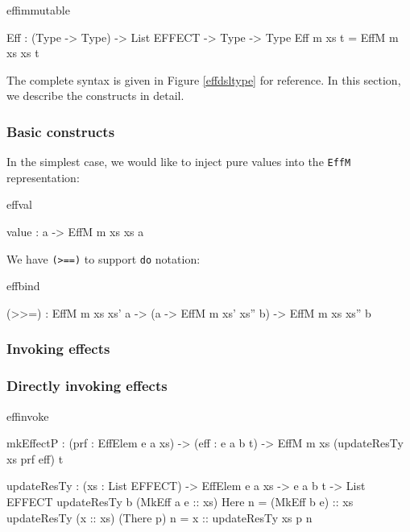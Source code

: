 \begin{SaveVerbatim}{effimmutable}

Eff : (Type -> Type) -> List EFFECT -> Type -> Type
Eff m xs t = EffM m xs xs t

\end{SaveVerbatim}

\noindent
The complete syntax is given in Figure \ref{effdsltype} for reference. In this
section, we describe the constructs in detail.

\subsubsection{Basic constructs}

In the simplest case, we would like to inject pure values into the
\texttt{EffM} representation:

\begin{SaveVerbatim}{effval}

value : a -> EffM m xs xs a

\end{SaveVerbatim}

We have \texttt{(>==)} to support \texttt{do} notation:

\begin{SaveVerbatim}{effbind}

(>>=) : EffM m xs xs' a -> 
        (a -> EffM m xs' xs'' b) -> EffM m xs xs'' b

\end{SaveVerbatim}

\subsubsection{Invoking effects}

\subsubsection*{Directly invoking effects}

\begin{SaveVerbatim}{effinvoke}

mkEffectP : (prf : EffElem e a xs) -> (eff : e a b t) -> 
          EffM m xs (updateResTy xs prf eff) t

\end{SaveVerbatim}

\begin{SaveVerbatim}{}

updateResTy : (xs : List EFFECT) -> 
              EffElem e a xs -> e a b t -> List EFFECT
updateResTy {b} (MkEff a e :: xs) Here      n 
                 = (MkEff b e) :: xs
updateResTy     (x :: xs)         (There p) n 
                 = x :: updateResTy xs p n

\end{SaveVerbatim}
\useverb{}

